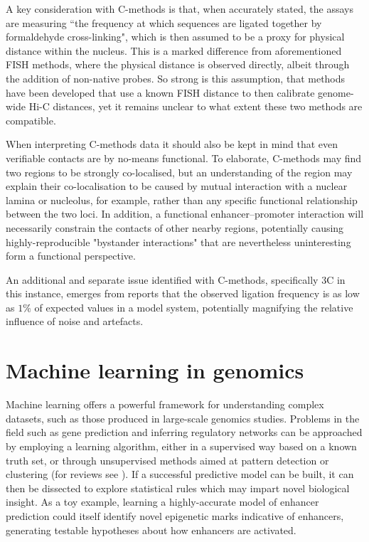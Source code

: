 \documentclass[a4paper,10pt,oneside]{book}
\begin{document}
A key consideration with C-methods is that, when accurately stated, the assays are measuring ``the frequency at which sequences are ligated together by formaldehyde cross-linking",\cite{Williamson2014} which is then assumed to be a proxy for physical distance within the nucleus. This is a marked difference from aforementioned FISH methods, where the physical distance is observed directly, albeit through the addition of non-native probes. So strong is this assumption, that methods have been developed that use a known FISH distance to then calibrate genome-wide Hi-C distances,\cite{Shavit2014} yet it remains unclear to what extent these two methods are compatible.

When interpreting C-methods data it should also be kept in mind that even verifiable contacts are by no-means functional. To elaborate, C-methods may find two regions to be strongly co-localised, but an understanding of the region may explain their co-localisation to be caused by mutual interaction with a nuclear lamina or nucleolus, for example, rather than any specific functional relationship between the two loci.\cite{Dekker2013} In addition, a functional enhancer--promoter interaction will necessarily constrain the contacts of other nearby regions, potentially causing highly-reproducible "bystander interactions"\cite{Dekker2013} that are nevertheless uninteresting form a functional perspective. 


An additional and separate issue identified with C-methods, specifically 3C in this instance, emerges from reports that the observed ligation frequency is as low as $1\%$ of expected values in a model system,\cite{Gavrilov2013} potentially magnifying the relative influence of noise and artefacts.

\section{Machine learning in genomics}

Machine learning offers a powerful framework for understanding complex datasets, such as those produced in large-scale genomics studies. Problems in the field such as gene prediction and inferring regulatory networks can be approached by employing a learning algorithm, either in a supervised way based on a known truth set, or through unsupervised methods aimed at pattern detection or clustering (for reviews see ). If a successful predictive model can be built, it can then be dissected to explore statistical rules which may impart novel biological insight. As a toy example, learning a highly-accurate model of enhancer prediction could itself identify novel epigenetic marks indicative of enhancers, generating testable hypotheses about how enhancers are activated.
\end{document}
